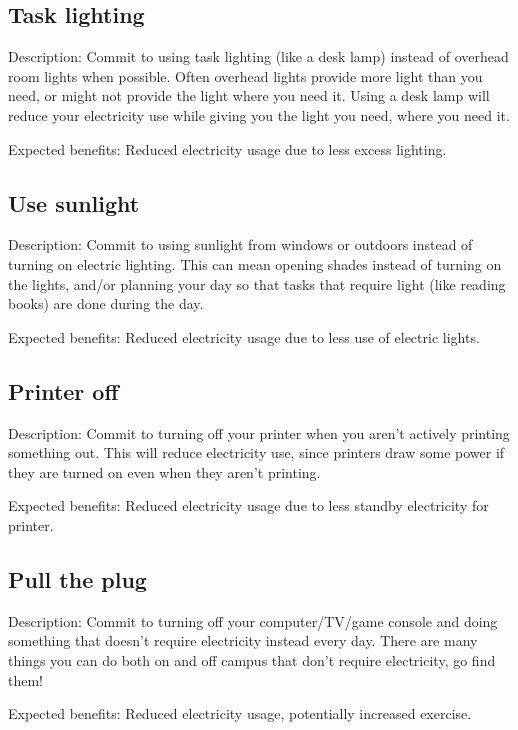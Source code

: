 \subsection{Task lighting}

Description: Commit to using task lighting (like a desk lamp) instead of overhead room lights when possible. Often overhead lights provide more light than you need, or might not provide the light where you need it. Using a desk lamp will reduce your electricity use while giving you the light you need, where you need it.

Expected benefits: Reduced electricity usage due to less excess lighting.


\subsection{Use sunlight}

Description: Commit to using sunlight from windows or outdoors instead of turning on electric lighting. This can mean opening shades instead of turning on the lights, and/or planning your day so that tasks that require light (like reading books) are done during the day.

Expected benefits: Reduced electricity usage due to less use of electric lights.


\subsection{Printer off}

Description: Commit to turning off your printer when you aren't actively printing something out. This will reduce electricity use, since printers draw some power if they are turned on even when they aren't printing.

Expected benefits: Reduced electricity usage due to less standby electricity for printer.


\subsection{Pull the plug}

Description: Commit to turning off your computer/TV/game console and doing something that doesn't require electricity instead every day. There are many things you can do both on and off campus that don't require electricity, go find them!

Expected benefits: Reduced electricity usage, potentially increased exercise.


